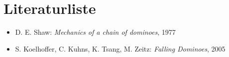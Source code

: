 \documentclass[11pt,a4paper]{scrartcl}
\begin{document}
\section{Literaturliste}
\begin{itemize}
	\item D. E. Shaw: \emph{Mechanics of a chain of dominoes}, 1977
	\item S. Koelhoffer, C. Kuhns, K. Tsang, M. Zeitz: \emph{Falling Dominoes}, 2005 \\
\end{itemize}
\end{document}
